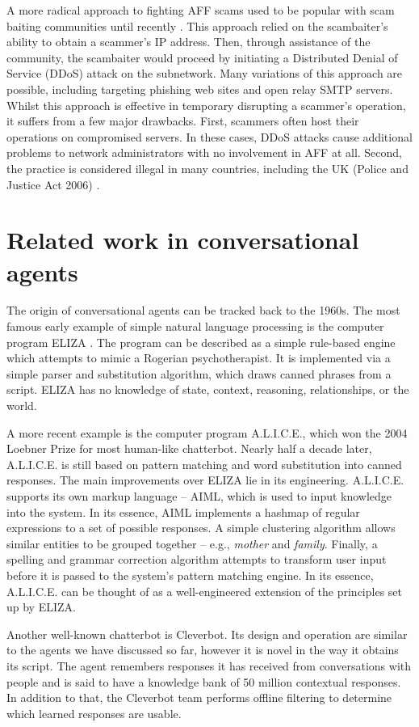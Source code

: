 A more radical approach to fighting AFF scams used to be popular with scam baiting communities until recently \cite{P9}. This approach relied on the scambaiter's ability to obtain a scammer's IP address. Then, through assistance of the community, the scambaiter would proceed by initiating a Distributed Denial of Service (DDoS) attack on the subnetwork. Many variations of this approach are possible, including targeting phishing web sites and open relay SMTP servers. Whilst this approach is effective in temporary disrupting a scammer's operation, it suffers from a few major drawbacks. First, scammers often host their operations on compromised servers. In these cases, DDoS attacks cause additional problems to network administrators with no involvement in AFF at all. Second, the practice is considered illegal in many countries, including the UK (Police and Justice Act 2006) \nocite{P10}.

\section{Related work in conversational agents}
The origin of conversational agents can be tracked back to the 1960s. The most famous early example of simple natural language processing is the computer program ELIZA \cite{P11}. The program can be described as a simple rule-based engine which attempts to mimic a Rogerian psychotherapist. It is implemented via a simple parser and substitution algorithm, which draws canned phrases from a script. ELIZA has no knowledge of state, context, reasoning, relationships, or the world.

A more recent example is the computer program A.L.I.C.E., which won the 2004 Loebner Prize for most human-like chatterbot. Nearly half a decade later, A.L.I.C.E. is still based on pattern matching and word substitution into canned responses. The main improvements over ELIZA lie in its engineering. A.L.I.C.E. supports its own markup language -- AIML, which is used to input knowledge into the system. In its essence, AIML implements a hashmap of regular expressions to a set of possible responses. A simple clustering algorithm allows similar entities to be grouped together -- e.g., \emph{mother} and \emph{family}. Finally, a spelling and grammar correction algorithm attempts to transform user input before it is passed to the system's pattern matching engine. In its essence, A.L.I.C.E. can be thought of as a well-engineered extension of the principles set up by ELIZA.

Another well-known chatterbot is Cleverbot. Its design and operation are similar to the agents we have discussed so far, however it is novel in the way it obtains its script. The agent remembers responses it has received from conversations with people and is said to have a knowledge bank of 50 million contextual responses. In addition to that, the Cleverbot team performs offline filtering to determine which learned responses are usable.

